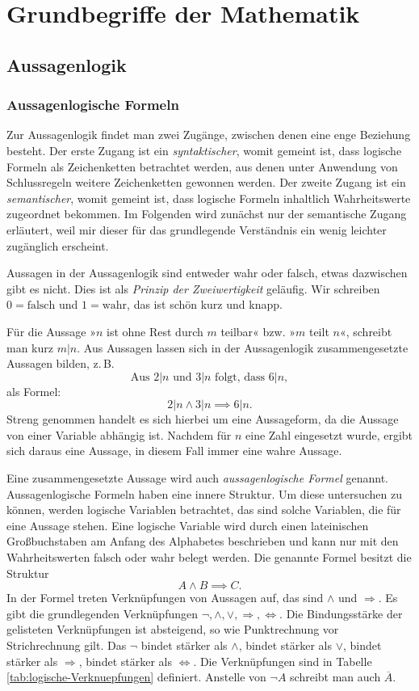 
\chapter{Grundbegriffe der Mathematik}

\section{Aussagenlogik}

\subsection{Aussagenlogische Formeln}

Zur Aussagenlogik findet man zwei Zugänge, zwischen denen eine enge
Beziehung besteht. Der erste Zugang ist ein \emph{syntaktischer},
womit gemeint ist, dass logische Formeln als Zeichenketten
betrachtet werden, aus denen unter Anwendung von Schlussregeln weitere
Zeichenketten gewonnen werden. Der zweite Zugang ist ein
\emph{semantischer}, womit gemeint ist, dass logische Formeln
inhaltlich Wahrheitswerte zugeordnet bekommen. Im Folgenden wird
zunächst nur der semantische Zugang erläutert, weil mir dieser für das
grundlegende Verständnis ein wenig leichter zugänglich erscheint.

Aussagen in der Aussagenlogik sind entweder wahr oder falsch,
etwas dazwischen gibt es nicht. Dies ist als \emph{Prinzip
der Zweiwertigkeit} geläufig.
Wir schreiben $0=\text{falsch}$ und $1=\text{wahr}$, das ist schön
kurz und knapp.

Für die Aussage »$n$ ist ohne Rest durch $m$ teilbar« bzw.
»$m$ teilt $n$«, schreibt man kurz $m|n$. Aus Aussagen lassen sich
in der Aussagenlogik zusammengesetzte Aussagen bilden, z.\,B.
\[\text{Aus $2|n$ und $3|n$ folgt, dass $6|n$},\]
als Formel:
\[2|n\land 3|n \implies 6|n.\]
Streng genommen handelt es sich hierbei um eine Aussageform, da die
Aussage von einer Variable abhängig ist. Nachdem für $n$ eine Zahl
eingesetzt wurde, ergibt sich daraus eine Aussage, in diesem Fall
immer eine wahre Aussage.

Eine zusammengesetzte Aussage wird auch \emph{aussagenlogische Formel}
genannt. Aussagenlogische Formeln haben eine innere Struktur. Um diese
untersuchen zu können, werden logische Variablen betrachtet,
das sind solche Variablen, die für eine Aussage stehen. Eine
logische Variable wird durch einen lateinischen Großbuchstaben
am Anfang des Alphabetes beschrieben und kann nur mit den
Wahrheitswerten falsch oder wahr belegt werden. Die genannte Formel
besitzt die Struktur
\[A\land B \implies C.\]
In der Formel treten Verknüpfungen von Aussagen auf, das sind
$\land$ und $\Rightarrow$. Es gibt die grundlegenden Verknüpfungen
$\neg,\land,\lor,\Rightarrow,\Leftrightarrow$. Die Bindungsstärke
der gelisteten Verknüpfungen ist absteigend, so wie Punktrechnung
vor Strichrechnung gilt. Das $\neg$ bindet stärker als $\land$,
bindet stärker als $\lor$, bindet stärker als $\Rightarrow$,
bindet stärker als $\Leftrightarrow$. Die Verknüpfungen sind
in Tabelle \ref{tab:logische-Verknuepfungen} definiert.
Anstelle von $\neg A$ schreibt man auch $\overline A$.

